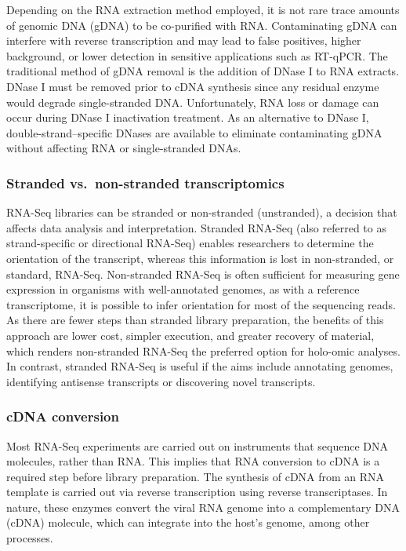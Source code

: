 \documentclass[
]{book}
\begin{document}
Depending on the RNA extraction method employed, it is not rare trace amounts of genomic DNA (gDNA) to be co-purified with RNA. Contaminating gDNA can interfere with reverse transcription and may lead to false positives, higher background, or lower detection in sensitive applications such as RT-qPCR. The traditional method of gDNA removal is the addition of DNase I to RNA extracts. DNase I must be removed prior to cDNA synthesis since any residual enzyme would degrade single-stranded DNA. Unfortunately, RNA loss or damage can occur during DNase I inactivation treatment. As an alternative to DNase I, double-strand--specific DNases are available to eliminate contaminating gDNA without affecting RNA or single-stranded DNAs.

\hypertarget{stranded-transcriptomics}{%
\subsubsection*{Stranded vs.~non-stranded transcriptomics}\label{stranded-transcriptomics}}

RNA-Seq libraries can be stranded or non-stranded (unstranded), a decision that affects data analysis and interpretation. Stranded RNA-Seq (also referred to as strand-specific or directional RNA-Seq) enables researchers to determine the orientation of the transcript, whereas this information is lost in non-stranded, or standard, RNA-Seq. Non-stranded RNA-Seq is often sufficient for measuring gene expression in organisms with well-annotated genomes, as with a reference transcriptome, it is possible to infer orientation for most of the sequencing reads. As there are fewer steps than stranded library preparation, the benefits of this approach are lower cost, simpler execution, and greater recovery of material, which renders non-stranded RNA-Seq the preferred option for holo-omic analyses. In contrast, stranded RNA-Seq is useful if the aims include annotating genomes, identifying antisense transcripts or discovering novel transcripts.

\hypertarget{cDNA-conversion}{%
\subsubsection*{cDNA conversion}\label{cDNA-conversion}}

Most RNA-Seq experiments are carried out on instruments that sequence DNA molecules, rather than RNA. This implies that RNA conversion to cDNA is a required step before library preparation. The synthesis of cDNA from an RNA template is carried out via reverse transcription using reverse transcriptases. In nature, these enzymes convert the viral RNA genome into a complementary DNA (cDNA) molecule, which can integrate into the host's genome, among other processes.
\end{document}
